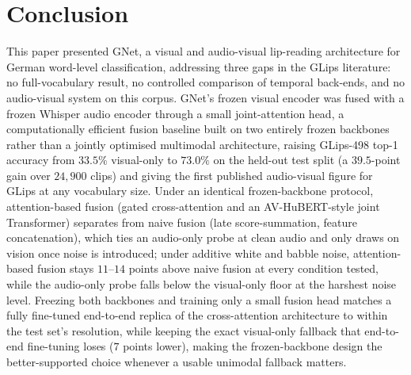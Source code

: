 \documentclass[10pt, a4paper]{article}
\begin{document}
\section{Conclusion}
\noindent This paper presented GNet, a visual and audio-visual lip-reading architecture for German word-level classification, addressing three gaps in the GLips literature: no full-vocabulary result, no controlled comparison of temporal back-ends, and no audio-visual system on this corpus. GNet's frozen visual encoder was fused with a frozen Whisper audio encoder \citep{radford2022whisper} through a small joint-attention head, a computationally efficient fusion baseline built on two entirely frozen backbones rather than a jointly optimised multimodal architecture, raising GLips-498 top-1 accuracy from $33.5\%$ visual-only to $73.0\%$ on the held-out test split (a $39.5$-point gain over $24{,}900$ clips) and giving the first published audio-visual figure for GLips at any vocabulary size. Under an identical frozen-backbone protocol, attention-based fusion (gated cross-attention and an AV-HuBERT-style \citep{shi2022avhubert} joint Transformer) separates from naive fusion (late score-summation, feature concatenation), which ties an audio-only probe at clean audio and only draws on vision once noise is introduced; under additive white and babble noise, attention-based fusion stays $11$--$14$ points above naive fusion at every condition tested, while the audio-only probe falls below the visual-only floor at the harshest noise level. Freezing both backbones and training only a small fusion head matches a fully fine-tuned end-to-end replica of the cross-attention architecture to within the test set's resolution, while keeping the exact visual-only fallback that end-to-end fine-tuning loses ($7$ points lower), making the frozen-backbone design the better-supported choice whenever a usable unimodal fallback matters.
\end{document}

